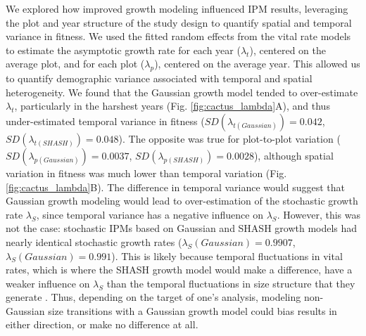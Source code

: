 \documentclass[12pt]{article}
\begin{document}
We explored how improved growth modeling influenced IPM results, leveraging the plot and year structure of the study design to quantify spatial and temporal variance in fitness.
We used the fitted random effects from the vital rate models to estimate the asymptotic growth rate for each year ($\lambda_t$), centered on the average plot, and for each plot ($\lambda_p$), centered on the average year.
This allowed us to quantify demographic variance associated with temporal and spatial heterogeneity. 
We found that the Gaussian growth model tended to over-estimate $\lambda_t$, particularly in the harshest years (Fig. \ref{fig:cactus_lambda}A), and thus under-estimated temporal variance in fitness ($SD(\lambda_{t(Gaussian)})=0.042$, $SD(\lambda_{t(SHASH)})=0.048$). 
The opposite was true for plot-to-plot variation ($SD(\lambda_{p(Gaussian)})=0.0037$, $SD(\lambda_{p(SHASH)})=0.0028$), although spatial variation in fitness was much lower than temporal variation (Fig. \ref{fig:cactus_lambda}B). 
The difference in temporal variance would suggest that Gaussian growth modeling would lead to over-estimation of the stochastic growth rate $\lambda_S$, since temporal variance has a negative influence on $\lambda_S$.
However, this was not the case: stochastic IPMs based on Gaussian and SHASH growth models had nearly identical stochastic growth rates ($\lambda_S(Gaussian)=0.9907$, $\lambda_S(Gaussian)=0.991$). 
This is likely because temporal fluctuations in vital rates, which is where the SHASH growth model would make a difference, have a weaker influence on $\lambda_S$ than the temporal fluctuations in size structure that they generate \citep{ellis2013role,compagnoni2016effect}. 
Thus, depending on the target of one's analysis, modeling non-Gaussian size transitions with a Gaussian growth model could bias results in either direction, or make no difference at all. 

\end{document}
